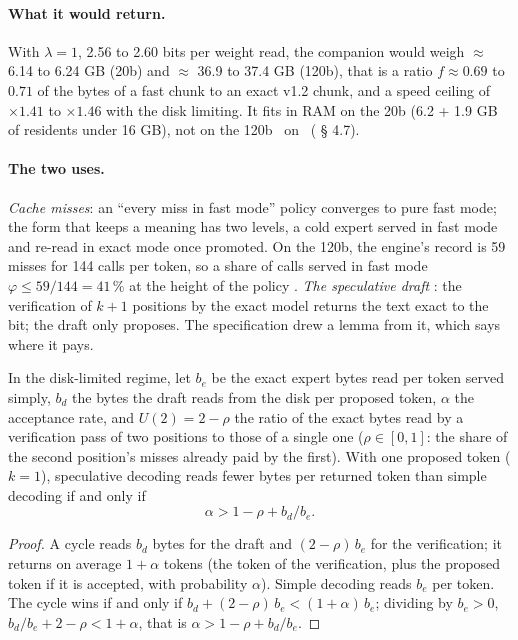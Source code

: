 \paragraph{What it would return.} With $\lambda = 1$, 2.56 to 2.60 bits per weight read, the companion would weigh $\approx$ 6.14 to 6.24 GB (20b) and $\approx$ 36.9 to 37.4 GB (120b), that is a ratio $f \approx 0.69$ to $0.71$ of the bytes of a fast chunk to an exact v1.2 chunk, and a speed ceiling of $\times 1.41$ to $\times 1.46$ with the disk limiting. It fits in RAM on the 20b (6.2 + 1.9 GB of residents under 16 GB), not on the 120b \calc~on \mes~( § 4.7).

\paragraph{The two uses.} \emph{Cache misses}: an ``every miss in fast mode'' policy converges to pure fast mode; the form that keeps a meaning has two levels, a cold expert served in fast mode and re-read in exact mode once promoted. On the 120b, the engine's record is 59 misses for 144 calls per token, so a share of calls served in fast mode $\varphi \le 59/144 = 41\,\%$ at the height of the policy \calc. \emph{The speculative draft} \parencite{leviathan2023}: the verification of $k+1$ positions by the exact model returns the text exact to the bit; the draft only proposes. The specification drew a lemma from it, which says where it pays.

\begin{lemme}\label{t3syn:lem:b2}
In the disk-limited regime, let $b_e$ be the exact expert bytes read per token served simply, $b_d$ the bytes the draft reads from the disk per proposed token, $\alpha$ the acceptance rate, and $U(2) = 2 - \rho$ the ratio of the exact bytes read by a verification pass of two positions to those of a single one ($\rho \in [0, 1]$: the share of the second position's misses already paid by the first). With one proposed token ($k = 1$), speculative decoding reads fewer bytes per returned token than simple decoding if and only if
\begin{equation}\label{t3syn:eq:b2}
\alpha > 1 - \rho + b_d/b_e.
\end{equation}
\end{lemme}

\begin{proof}
A cycle reads $b_d$ bytes for the draft and $(2 - \rho)\,b_e$ for the verification; it returns on average $1 + \alpha$ tokens (the token of the verification, plus the proposed token if it is accepted, with probability $\alpha$). Simple decoding reads $b_e$ per token. The cycle wins if and only if $b_d + (2 - \rho)\,b_e < (1 + \alpha)\,b_e$; dividing by $b_e > 0$, $b_d/b_e + 2 - \rho < 1 + \alpha$, that is $\alpha > 1 - \rho + b_d/b_e$.
\end{proof}


